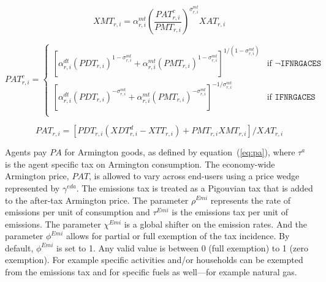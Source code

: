 \documentclass[11pt,letterpaper]{report}
\begin{document}
\begin{equation}
\label{eq:xmt}
\mathit{XMT}_{r,i} =
   \alpha^{\mathit{mt}}_{r,i}
   \left( \frac {\mathit{PAT}^c_{r,i}} {\mathit{PMT}_{r,i}}
   \right)^{\sigma^{\mathit{mt}}_{r,\mathit{i}}}
   \mathit{XAT}_{r,i}
\end{equation}

\begin{equation}
\label{eq:patc}
\mathit{PAT}^c_{r,i} =
\begin{cases}
\left[
   \alpha^{\mathit{dt}}_{r,i}
   \left( \mathit{PDT}_{r,i}
   \right)^{1-\sigma^{\mathit{mt}}_{r,\mathit{i}}}
+  \alpha^{\mathit{mt}}_{r,i}
   \left( \mathit{PMT}_{r,i}
   \right)^{1-\sigma^{\mathit{mt}}_{r,\mathit{i}}}
\right]^{1/(1-\sigma^{\mathit{mt}}_{r,\mathit{i}})}
&    \textrm{if } \lnot \texttt{IFNRGACES} \\
\left[
   \alpha^{\mathit{dt}}_{r,i}
   \left( \mathit{PDT}_{r,i}
   \right)^{-\sigma^{\mathit{mt}}_{r,\mathit{i}}}
+  \alpha^{\mathit{mt}}_{r,i}
   \left( \mathit{PMT}_{r,i}
   \right)^{-\sigma^{\mathit{mt}}_{r,\mathit{i}}}
\right]^{-1/\sigma^{\mathit{mt}}_{r,\mathit{i}}}
&    \textrm{if } \texttt{IFNRGACES} \\
\end{cases}
\end{equation}

\begin{equation}
\label{eq:pat}
\mathit{PAT}_{r,i} =
\left[\mathit{PDT}_{r,i} \left(\mathit{XDT}^d_{r,i} - \mathit{XTT}_{r,i} \right)
+ \mathit{PMT}_{r,i}\mathit{XMT}_{r,i} \right] \bigg / \mathit{XAT}_{r,i}
\end{equation}

Agents pay $\mathit{PA}$ for Armington goods, as defined by
equation~(\ref{eq:pa}), where $\tau^a$ is the agent specific tax on Armington
consumption. The economy-wide Armington price, $\mathit{PAT}$, is allowed to
vary across end-users using a price wedge represented by
$\gamma^{\mathit{eda}}$. The emissions tax is treated as a Pigouvian tax that is
added to the after-tax Armington price. The parameter $\rho^{\mathit{Emi}}$
represents the rate of emissions per unit of consumption and
$\tau^{\mathit{Emi}}$ is the emissions tax per unit of emissions. The parameter
$\chi^{\mathit{Emi}}$ is a global shifter on the emission rates. And the
parameter $\phi^{\mathit{Emi}}$ allows for partial or full exemption of the tax
incidence. By default, $\phi^{\mathit{Emi}}$ is set to 1. Any valid value is
between 0 (full exemption) to 1 (zero exemption). For example specific
activities and/or households can be exempted from the emissions tax and for
specific fuels as well---for example natural gas.
\end{document}
